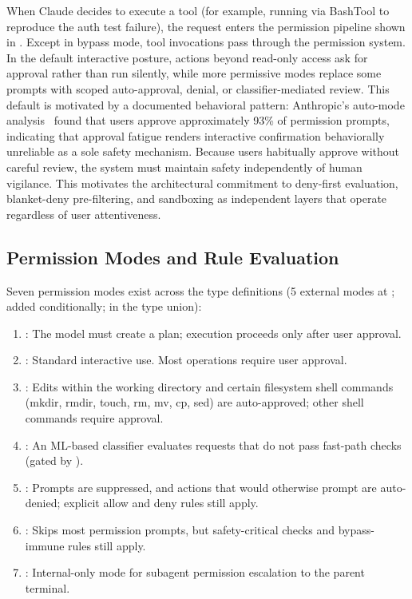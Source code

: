 When Claude decides to execute a tool (for example, running  via BashTool to reproduce the auth test failure), the request enters the permission pipeline shown in . Except in bypass mode, tool invocations pass through the permission system. In the default interactive posture, actions beyond read-only access ask for approval rather than run silently, while more permissive modes replace some prompts with scoped auto-approval, denial, or classifier-mediated review. This default is motivated by a documented behavioral pattern: Anthropic's auto-mode analysis~\citep{anthropic2026automode} found that users approve approximately 93\% of permission prompts, indicating that approval fatigue renders interactive confirmation behaviorally unreliable as a sole safety mechanism. Because users habitually approve without careful review, the system must maintain safety independently of human vigilance. This motivates the architectural commitment to deny-first evaluation, blanket-deny pre-filtering, and sandboxing as independent layers that operate regardless of user attentiveness.

\subsection{Permission Modes and Rule Evaluation}
\label{sec:auth:modes}

Seven permission modes exist across the type definitions (5 external modes at ;  added conditionally;  in the type union):

\begin{enumerate}[nosep]
  \item {}: The model must create a plan; execution proceeds only after user approval.
  \item {}: Standard interactive use. Most operations require user approval.
  \item {}: Edits within the working directory and certain filesystem shell commands (mkdir, rmdir, touch, rm, mv, cp, sed) are auto-approved; other shell commands require approval.
  \item {}: An ML-based classifier evaluates requests that do not pass fast-path checks (gated by ).
  \item {}: Prompts are suppressed, and actions that would otherwise prompt are auto-denied; explicit allow and deny rules still apply.
  \item {}: Skips most permission prompts, but safety-critical checks and bypass-immune rules still apply.
  \item {}: Internal-only mode for subagent permission escalation to the parent terminal.
\end{enumerate}

